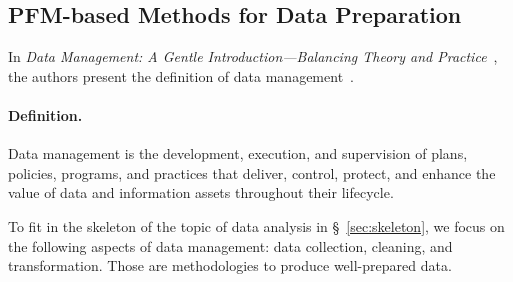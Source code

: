   \newlength{\rightParentNodeWidth}
  \setlength{\rightParentNodeWidth}{5cm} %
  
  \newlength{\leftNodeWidth}
  \setlength{\leftNodeWidth}{2.8cm} %
  
  \newlength{\middleNodeWidth}
  \setlength{\middleNodeWidth}{4.2cm} %
  
  \newlength{\middleNodeHeight}
  \setlength{\middleNodeHeight}{0.2cm} %
  
  \newlength{\rightNodeWidth}
  \setlength{\rightNodeWidth}{3.4cm} %
  
  \newlength{\leftVerticalSpacing}
  \setlength{\leftVerticalSpacing}{0.9cm} %
  
  \newlength{\middleVerticalSpacing}
  \setlength{\middleVerticalSpacing}{0.8cm} %
  
  \newlength{\rightVerticalSpacing}
  \setlength{\rightVerticalSpacing}{0.9cm} %
  
  \newlength{\horizontalSpacing}
  \setlength{\horizontalSpacing}{11cm} %
  
  
  
  \subsection{PFM-based Methods for Data Preparation}\label{sec:data_management}
  
  In \textit{Data Management: A Gentle Introduction—Balancing Theory and Practice}~\cite{van2020data}, the authors present the definition of data management~\cite{international2017dama}.
  
  \paragraph{Definition.} Data management is the development, execution, and supervision of plans, policies, programs, and practices that deliver, control, protect, and enhance the value of data and information assets throughout their lifecycle.
  
  To fit in the skeleton of the topic of data analysis in \S~\ref{sec:skeleton}, we focus on the following aspects of data management: data collection, cleaning, and transformation. Those are methodologies to produce well-prepared data.
  
